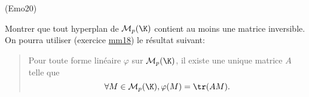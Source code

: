 \begin{tiny}(Emo20)\end{tiny} Montrer que tout hyperplan de $\mathcal{M}_p(\K)$ contient au moins une matrice inversible. On pourra utiliser (exercice \href{\exosurl _fex_mm.pdf}{mm18}) le résultat suivant:
\begin{quote}
Pour toute forme linéaire $\varphi$ sur $\mathcal{M}_p(\K)$, il existe une unique matrice $A$ telle que
\[
 \forall M \in \mathcal{M}_p(\K), \varphi(M) = \tr(AM).
\]  
\end{quote}


 
